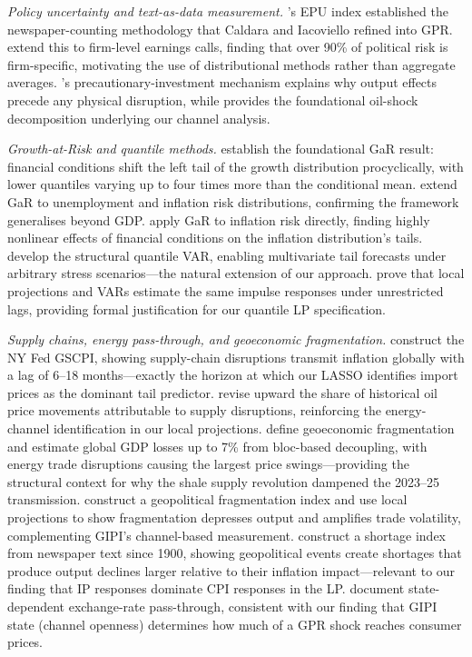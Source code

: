 \documentclass[12pt]{article}
\begin{document}
\noindent\textit{Policy uncertainty and text-as-data measurement.}
\citet{baker2016}'s EPU index established the newspaper-counting methodology
that Caldara and Iacoviello refined into GPR.
\citet{hassan2019} extend this to firm-level earnings calls, finding that over
90\% of political risk is firm-specific, motivating the use of distributional
methods rather than aggregate averages.
\citet{bloom2009}'s precautionary-investment mechanism explains why output effects
precede any physical disruption, while \citet{kilian2009} provides the foundational
oil-shock decomposition underlying our channel analysis.

\noindent\textit{Growth-at-Risk and quantile methods.}
\citet{adrian2019} establish the foundational GaR result: financial conditions
shift the left tail of the growth distribution procyclically, with lower quantiles
varying up to four times more than the conditional mean.
\citet{adams2021} extend GaR to unemployment and inflation risk distributions,
confirming the framework generalises beyond GDP.
\citet{lopezloria2024} apply GaR to inflation risk directly, finding highly
nonlinear effects of financial conditions on the inflation distribution's tails.
\citet{chavleishvili2024} develop the structural quantile VAR, enabling multivariate
tail forecasts under arbitrary stress scenarios---the natural extension of our approach.
\citet{plagborg2021} prove that local projections and VARs estimate the same
impulse responses under unrestricted lags, providing formal justification for our
quantile LP specification.

\noindent\textit{Supply chains, energy pass-through, and geoeconomic fragmentation.}
\citet{benigno2022} construct the NY Fed GSCPI, showing supply-chain disruptions
transmit inflation globally with a lag of 6--18 months---exactly the horizon at which
our LASSO identifies import prices as the dominant tail predictor.
\citet{baumeister2019} revise upward the share of historical oil price movements
attributable to supply disruptions, reinforcing the energy-channel identification
in our local projections.
\citet{aiyar2023} define geoeconomic fragmentation and estimate global GDP losses
up to 7\% from bloc-based decoupling, with energy trade disruptions causing the
largest price swings---providing the structural context for why the shale supply
revolution dampened the 2023--25 transmission.
\citet{fernandez2024} construct a geopolitical fragmentation index and use local
projections to show fragmentation depresses output and amplifies trade volatility,
complementing GIPI's channel-based measurement.
\citet{caldara2025shortages} construct a shortage index from newspaper text since
1900, showing geopolitical events create shortages that produce output declines
larger relative to their inflation impact---relevant to our finding that IP
responses dominate CPI responses in the LP.
\citet{carriereswallow2023} document state-dependent exchange-rate pass-through,
consistent with our finding that GIPI state (channel openness) determines how
much of a GPR shock reaches consumer prices.
\end{document}
